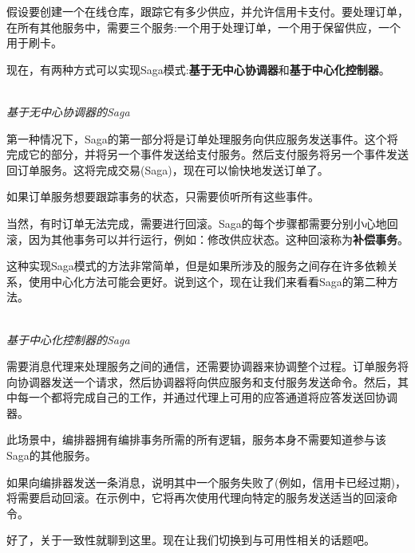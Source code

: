 假设要创建一个在线仓库，跟踪它有多少供应，并允许信用卡支付。要处理订单，在所有其他服务中，需要三个服务:一个用于处理订单，一个用于保留供应，一个用于刷卡。

现在，有两种方式可以实现Saga模式:\textbf{基于无中心协调器}和\textbf{基于中心化控制器}。

\hspace*{\fill} \\ %
\noindent
\textit{基于无中心协调器的Saga}

第一种情况下，Saga的第一部分将是订单处理服务向供应服务发送事件。这个将完成它的部分，并将另一个事件发送给支付服务。然后支付服务将另一个事件发送回订单服务。这将完成交易(Saga)，现在可以愉快地发送订单了。

如果订单服务想要跟踪事务的状态，只需要侦听所有这些事件。

当然，有时订单无法完成，需要进行回滚。Saga的每个步骤都需要分别小心地回滚，因为其他事务可以并行运行，例如：修改供应状态。这种回滚称为\textbf{补偿事务}。

这种实现Saga模式的方法非常简单，但是如果所涉及的服务之间存在许多依赖关系，使用中心化方法可能会更好。说到这个，现在让我们来看看Saga的第二种方法。

\hspace*{\fill} \\ %
\noindent
\textit{基于中心化控制器的Saga}

需要消息代理来处理服务之间的通信，还需要协调器来协调整个过程。订单服务将向协调器发送一个请求，然后协调器将向供应服务和支付服务发送命令。然后，其中每一个都将完成自己的工作，并通过代理上可用的应答通道将应答发送回协调器。

此场景中，编排器拥有编排事务所需的所有逻辑，服务本身不需要知道参与该Saga的其他服务。

如果向编排器发送一条消息，说明其中一个服务失败了(例如，信用卡已经过期)，将需要启动回滚。在示例中，它将再次使用代理向特定的服务发送适当的回滚命令。

好了，关于一致性就聊到这里。现在让我们切换到与可用性相关的话题吧。




